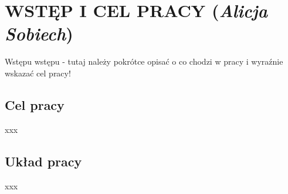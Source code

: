 \chapter{WSTĘP I CEL PRACY (\textit{Alicja Sobiech})}
\label{chap:introduction}
Wstępu wstępu - tutaj należy pokrótce opisać o co chodzi w pracy i wyraźnie wskazać cel pracy!
\section{Cel pracy}
xxx
\section{Układ pracy}
xxx

